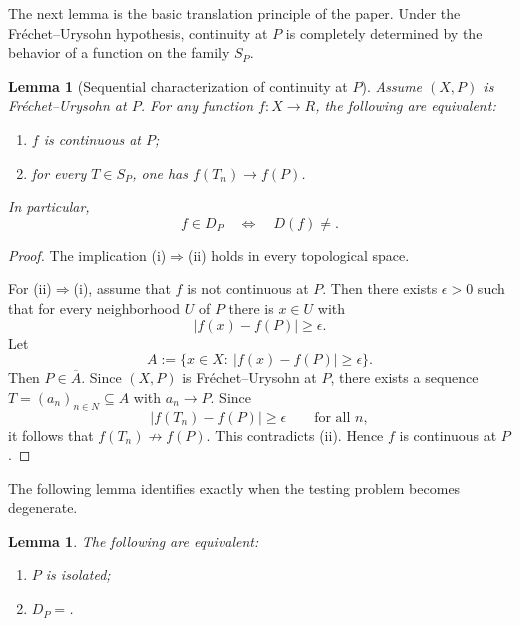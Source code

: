 \documentclass[11pt]{amsart}
\theoremstyle{plain}
\newtheorem{lemma}[theorem]{Lemma}
\theoremstyle{definition}
\theoremstyle{remark}
\newcommand{\Sp}{\mathcal{S}_P}
\newcommand{\Dp}{\mathcal{D}_P}
\newcommand{\N}{\mathbb{N}}
\newcommand{\R}{\mathbb{R}}
\newcommand{\e}{\epsilon}
\newcommand{\cl}[1]{\overline{#1}}
\def\Sp{S_P}%
\def\Dp{D_P}%
\def\N{N}%
\def\R{R}%
\def\emptyset{}%
\begin{document}
The next lemma is the basic translation principle of the paper.
Under the Fr\'echet--Urysohn hypothesis, continuity at $P$ is completely determined by the behavior of a function on the family $\Sp$.

\begin{lemma}[Sequential characterization of continuity at $P$]\label{lem:seq_char_continuity}
Assume $(X,P)$ is Fr\'echet--Urysohn at $P$.
For any function $f:X\to\R$, the following are equivalent:
\begin{enumerate}[label=(\roman*)]
\item $f$ is continuous at $P$;
\item for every $T\in\Sp$, one has $f(T_n)\to f(P)$.
\end{enumerate}
In particular,
\[
f\in\Dp \quad\Longleftrightarrow\quad D(f)\neq\emptyset.
\]
\end{lemma}

\begin{proof}
The implication (i)$\Rightarrow$(ii) holds in every topological space.

For (ii)$\Rightarrow$(i), assume that $f$ is not continuous at $P$.
Then there exists $\e>0$ such that for every neighborhood $U$ of $P$ there is $x\in U$ with
\[
|f(x)-f(P)|\ge \e.
\]
Let
\[
A:=\{x\in X:\ |f(x)-f(P)|\ge\e\}.
\]
Then $P\in\cl{A}$.
Since $(X,P)$ is Fr\'echet--Urysohn at $P$, there exists a sequence $T=(a_n)_{n\in\N}\subseteq A$ with $a_n\to P$.
Since
\[
|f(T_n)-f(P)|\ge\e \qquad\text{for all } n,
\]
it follows that $f(T_n)\not\to f(P)$.
This contradicts (ii).
Hence $f$ is continuous at $P$.
\end{proof}

The following lemma identifies exactly when the testing problem becomes degenerate.

\begin{lemma}\label{lem:isolated_implies_Dp_empty}
The following are equivalent:
\begin{enumerate}[label=(\roman*)]
\item $P$ is isolated;
\item $\Dp=\emptyset$.
\end{enumerate}
\end{lemma}
\end{document}
